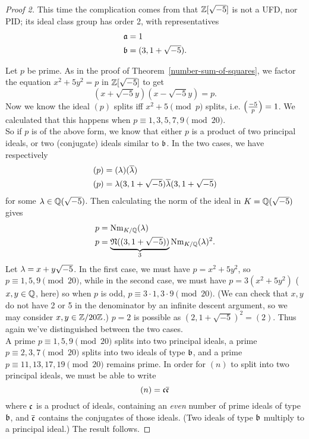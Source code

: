 \begin{proof}[Proof 2]
This time the complication comes from that $\mathbb{Z}[\sqrt{-5}]$ is not a UFD, nor PID; its ideal class group has order 2, with representatives 
\begin{align*}
\mathfrak{a}&=1\\
\mathfrak{b}&=(3,1+\sqrt{-5}).
\end{align*}

Let $p$ be prime. 
As in the proof of Theorem~\ref{number-sum-of-squares}, we factor the equation $x^2+5y^2=p$ in $\mathbb{Z}[\sqrt{-5}]$ to get
\[
(x+\sqrt{-5}y)(x-\sqrt{-5}y)=p.
\]
Now we know the ideal $(p)$ splits iff $x^2+5\pmod p$ splits, i.e. $\left( {\frac{-5}{p}} \right)=1$. We calculated that this happens when $p\equiv 1,3,5,7,9\pmod{20}$.\\

So if $p$ is of the above form, we know that either $p$ is a product of two principal ideals, or two (conjugate) ideals similar to $\mathfrak{b}$. In the two cases, we have respectively
\begin{align*}
(p)&=(\lambda)(\overline{\lambda})\\
(p)&=\lambda(3,1+\sqrt{-5})\overline{\lambda}(3,1+\sqrt{-5})
\end{align*}
for some $\lambda\in \mathbb{Q}(\sqrt{-5})$. 
Then calculating the norm of the ideal in $K=\mathbb{Q}(\sqrt{-5})$ gives
\begin{align*}
p&=\operatorname{Nm}_{K/\mathbb{Q}}(\lambda)\\
p&=\underbrace{\mathfrak N((3,1+\sqrt{-5}))}_3\operatorname{Nm}_{K/\mathbb{Q}}(\lambda)^2.
\end{align*}Let $\lambda=x+y\sqrt{-5}$.
In the first case, we must have $p=x^2+5y^2$, so $p\equiv 1,5,9\pmod{20}$, while in the second case, we must have $p=3(x^2+5y^2)$ ($x,y\in \mathbb{Q}$, here) so when $p$ is odd, $p\equiv 3\cdot 1,3\cdot 9\pmod{20}$. (We can check that $x,y$ do not have 2 or 5 in the denominator by an infinite descent argument, so we may consider $x,y\in \mathbb{Z}/20\mathbb{Z}$.) $p=2$ is possible as $(2,1+\sqrt{-5})^2=(2)$. 
Thus again we've distinguished between the two cases.\\

A prime $p\equiv 1,5,9\pmod{20}$ splits into two principal ideals, a prime $p\equiv 2,3,7\pmod{20}$ splits into two ideals of type $\mathfrak{b}$, and a prime $p\equiv 11,13, 17, 19\pmod{20}$ remains prime. In order for $(n)$ to split into two principal ideals, we must be able to write
\[
(n)=\mathfrak{c}\overline{\mathfrak{c}}
\]
where $\mathfrak{c}$ is a product of ideals, containing an {\it even} number of prime ideals of type $\mathfrak{b}$, and $\overline{\mathfrak{c}}$ contains the conjugates of those ideals. (Two ideals of type $\mathfrak{b}$ multiply to a principal ideal.) The result follows.
\end{proof}
